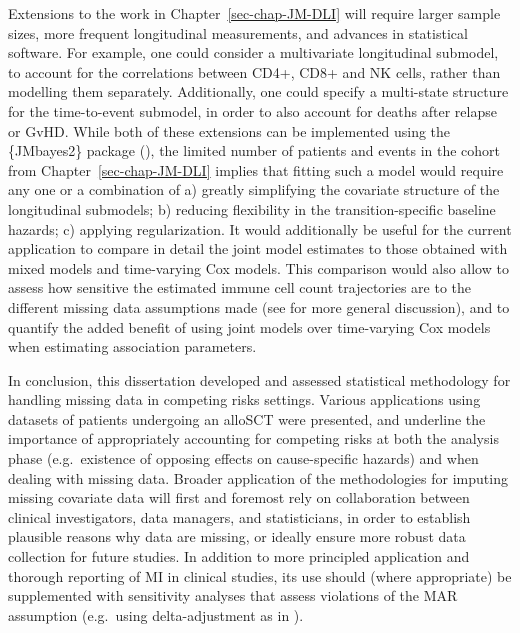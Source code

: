 \documentclass[
  letterpaper,
  paper=240mm:170mm,
  twoside=true,
  open=right,
  fontsize=10pt,
  pagesize=false,
  BCOR=15mm,
  DIV=14,
  headinclude=true,
  footinclude=false,
  headsepline=on]{scrbook}
\begin{document}
Extensions to the work in Chapter~\ref{sec-chap-JM-DLI} will require
larger sample sizes, more frequent longitudinal measurements, and
advances in statistical software. For example, one could consider a
multivariate longitudinal submodel, to account for the correlations
between CD4+, CD8+ and NK cells, rather than modelling them separately.
Additionally, one could specify a multi-state structure for the
time-to-event submodel, in order to also account for deaths after
relapse or GvHD. While both of these extensions can be implemented using
the \{JMbayes2\} package
(), the limited number of patients and events in the cohort
from Chapter~\ref{sec-chap-JM-DLI} implies that fitting such a model
would require any one or a combination of a) greatly simplifying the
covariate structure of the longitudinal submodels; b) reducing
flexibility in the transition-specific baseline hazards; c) applying
regularization. It would additionally be useful for the current
application to compare in detail the joint model estimates to those
obtained with mixed models and time-varying Cox models. This comparison
would also allow to assess how sensitive the estimated immune cell count
trajectories are to the different missing data assumptions made (see
 for more general discussion), and to quantify the added
benefit of using joint models over time-varying Cox models when
estimating association parameters.

In conclusion, this dissertation developed and assessed statistical
methodology for handling missing data in competing risks settings.
Various applications using datasets of patients undergoing an alloSCT
were presented, and underline the importance of appropriately accounting
for competing risks at both the analysis phase (e.g.~existence of
opposing effects on cause-specific hazards) and when dealing with
missing data. Broader application of the methodologies for imputing
missing covariate data will first and foremost rely on collaboration
between clinical investigators, data managers, and statisticians, in
order to establish plausible reasons why data are missing, or ideally
ensure more robust data collection for future studies. In addition to
more principled application and thorough reporting of MI in clinical
studies, its use should (where appropriate) be supplemented with
sensitivity analyses that assess violations of the MAR assumption
(e.g.~using delta-adjustment as in
).
\end{document}
